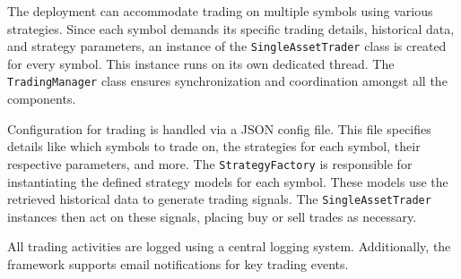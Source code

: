 The deployment can accommodate trading on multiple symbols using various strategies.
Since each symbol demands its specific trading details, historical data, and strategy parameters, an instance of the \texttt{SingleAssetTrader} class is created for every symbol.
This instance runs on its own dedicated thread. The \texttt{TradingManager} class ensures synchronization and coordination amongst all the components.

Configuration for trading is handled via a JSON config file.
This file specifies details like which symbols to trade on, the strategies for each symbol, their respective parameters, and more.
The \texttt{StrategyFactory} is responsible for instantiating the defined strategy models for each symbol.
These models use the retrieved historical data to generate trading signals. The \texttt{SingleAssetTrader} instances then act on these signals, placing buy or sell trades as necessary.

All trading activities are logged using a central logging system. Additionally, the framework supports email notifications for key trading events.
